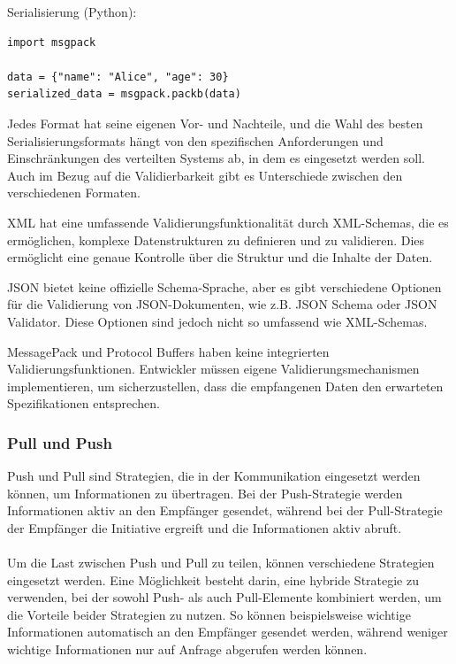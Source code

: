 Serialisierung (Python):\\
\begin{lstlisting}[caption={MessagePack},captionpos=b,label={lst:msgpack}]
import msgpack

data = {"name": "Alice", "age": 30}
serialized_data = msgpack.packb(data)
\end{lstlisting}
Jedes Format hat seine eigenen Vor- und Nachteile, und die Wahl des besten Serialisierungsformats hängt von den spezifischen Anforderungen und Einschränkungen des verteilten Systems ab, in dem es eingesetzt werden soll.
Auch im Bezug auf die Validierbarkeit gibt es Unterschiede zwischen den verschiedenen Formaten.

XML hat eine umfassende Validierungsfunktionalität durch XML-Schemas, die es ermöglichen, komplexe Datenstrukturen zu definieren und zu validieren. Dies ermöglicht eine genaue Kontrolle über die Struktur und die Inhalte der Daten.

JSON bietet keine offizielle Schema-Sprache, aber es gibt verschiedene Optionen für die Validierung von JSON-Dokumenten, wie z.B. JSON Schema oder JSON Validator. Diese Optionen sind jedoch nicht so umfassend wie XML-Schemas.

MessagePack und Protocol Buffers haben keine integrierten Validierungsfunktionen. Entwickler müssen eigene Validierungsmechanismen implementieren, um sicherzustellen, dass die empfangenen Daten den erwarteten Spezifikationen entsprechen.

\subsubsection{Pull und Push}

Push und Pull sind Strategien, die in der Kommunikation eingesetzt werden können, um Informationen zu übertragen. Bei der Push-Strategie werden Informationen aktiv an den Empfänger gesendet, während bei der Pull-Strategie der Empfänger die Initiative ergreift und die Informationen aktiv abruft.
\\\\
Um die Last zwischen Push und Pull zu teilen, können verschiedene Strategien eingesetzt werden. Eine Möglichkeit besteht darin, eine hybride Strategie zu verwenden, bei der sowohl Push- als auch Pull-Elemente kombiniert werden, um die Vorteile beider Strategien zu nutzen. So können beispielsweise wichtige Informationen automatisch an den Empfänger gesendet werden, während weniger wichtige Informationen nur auf Anfrage abgerufen werden können.

